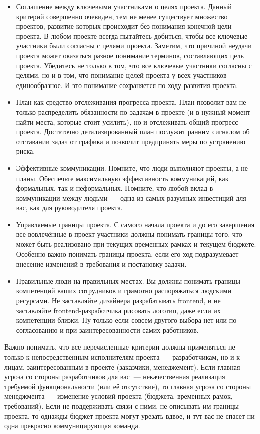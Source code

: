 \documentclass{../../text-style}
\begin{document}
\begin{itemize}
    \item Соглашение между ключевыми участниками о целях проекта. Данный критерий совершенно очевиден, тем не менее существует множество проектов, развитие которых происходит без понимания конечной цели проекта. В любом проекте всегда пытайтесь добиться, чтобы все ключевые участники были согласны с целями проекта. Заметим, что причиной неудачи проекта может оказаться разное понимание терминов, составляющих цель проекта. Убедитесь не только в том, что все ключевые участники согласны с целями, но и в том, что понимание целей проекта у всех участников единообразное. И это понимание сохраняется по ходу развития проекта.
    \item План как средство отслеживания прогресса проекта. План позволит вам не только распределить обязанности по задачам в проекте (и в нужный момент найти места, которые стоит усилить), но и отслеживать общий прогресс проекта. Достаточно детализированный план послужит ранним сигналом об отставании задач от графика и позволит предпринять меры по устранению риска.
    \item Эффективные коммуникации. Помните, что люди выполняют проекты, а не планы. Обеспечьте максимальную эффективность коммуникаций, как формальных, так и неформальных. Помните, что любой вклад в коммуникации между людьми~--- одна из самых разумных инвестиций для вас, как для руководителя проекта.
    \item Управляемые границы проекта. С самого начала проекта и до его завершения все вовлечённые в проект участники должны понимать границы того, что может быть реализовано при текущих временных рамках и текущем бюджете. Особенно важно понимать границы проекта, если его ход подразумевает внесение изменений в требования и постановку задачи.
    \item Правильные люди на правильных местах. Вы должны понимать границы компетенций ваших сотрудников и грамотно распоряжаться людскими ресурсами. Не заставляйте дизайнера разрабатывать frontend, и не заставляйте frontend-разработчика рисовать логотип, даже если их компетенции близки. Ну только если совсем другого выбора нет или по согласованию и при заинтересованности самих работников.
\end{itemize}

Важно понимать, что все перечисленные критерии должны применяться не только к непосредственным исполнителям проекта~--- разработчикам, но и к лицам, заинтересованным в проекте (заказчики, менеджемент). Если главная угроза со стороны разработчиков для вас~--- некачественная реализация требуемой функциональности (или её отсутствие), то главная угроза со стороны менеджмента~--- изменение условий проекта (бюджета, временных рамок, требований). Если не поддерживать связи с ними, не описывать им границы проекта, то однажды бюджет проекта могут урезать вдвое, и тут вас не спасет ни одна прекрасно коммуницирующая команда.
\end{document}

